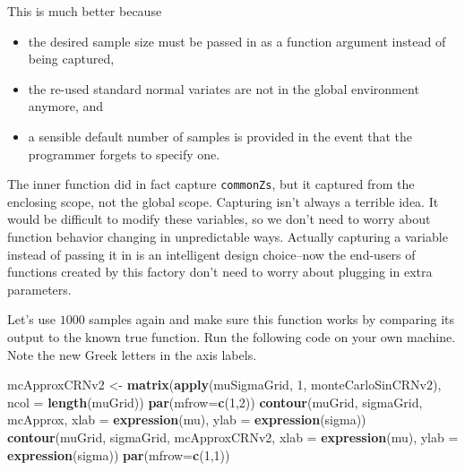\documentclass[12pt,krantz2]{krantz}
\makeatletter
\newenvironment{Shaded}{\begin{snugshade}}{\end{snugshade}}
\newcommand{\DataTypeTok}[1]{\textcolor[rgb]{0.27,0.27,0.27}{#1}}
\newcommand{\DecValTok}[1]{\textcolor[rgb]{0.06,0.06,0.06}{#1}}
\newcommand{\KeywordTok}[1]{\textcolor[rgb]{0.27,0.27,0.27}{\textbf{#1}}}
\newcommand{\NormalTok}[1]{#1}
\newcommand{\StringTok}[1]{\textcolor[rgb]{0.5,0.5,0.5}{#1}}
\providecommand{\tightlist}{%
  \setlength{\itemsep}{0pt}\setlength{\parskip}{0pt}}
\newenvironment{kframe}{%
\medskip{}
\setlength{\fboxsep}{.8em}
 \def\at@end@of@kframe{}%
 \ifinner\ifhmode%
  \def\at@end@of@kframe{\end{minipage}}%
  \begin{minipage}{\columnwidth}%
 \fi\fi%
 \def\FrameCommand##1{\hskip\@totalleftmargin \hskip-\fboxsep
 \colorbox{shadecolor}{##1}\hskip-\fboxsep
     \hskip-\linewidth \hskip-\@totalleftmargin \hskip\columnwidth}%
 \MakeFramed {\advance\hsize-\width
   \@totalleftmargin\z@ \linewidth\hsize
   \@setminipage}}%
 {\par\unskip\endMakeFramed%
 \at@end@of@kframe}
\renewenvironment{Shaded}{\begin{kframe}}{\end{kframe}}
\makeatother
\begin{document}
This is much better because

\begin{itemize}
\tightlist
\item
  the desired sample size must be passed in as a function argument instead of being captured,
\item
  the re-used standard normal variates are not in the global environment anymore, and
\item
  a sensible default number of samples is provided in the event that the programmer forgets to specify one.
\end{itemize}

The inner function did in fact capture \texttt{commonZs}, but it captured from the enclosing scope, not the global scope. Capturing isn't always a terrible idea. It would be difficult to modify these variables, so we don't need to worry about function behavior changing in unpredictable ways. Actually capturing a variable instead of passing it in is an intelligent design choice--now the end-users of functions created by this factory don't need to worry about plugging in extra parameters.

Let's use \(1000\) samples again and make sure this function works by comparing its output to the known true function. Run the following code on your own machine. Note the new Greek letters in the axis labels.

\begin{Shaded}
\begin{Highlighting}[]
\NormalTok{mcApproxCRNv2 <-}\StringTok{ }\KeywordTok{matrix}\NormalTok{(}\KeywordTok{apply}\NormalTok{(muSigmaGrid, }\DecValTok{1}\NormalTok{, monteCarloSinCRNv2), }
                        \DataTypeTok{ncol =} \KeywordTok{length}\NormalTok{(muGrid))}
\KeywordTok{par}\NormalTok{(}\DataTypeTok{mfrow=}\KeywordTok{c}\NormalTok{(}\DecValTok{1}\NormalTok{,}\DecValTok{2}\NormalTok{))}
\KeywordTok{contour}\NormalTok{(muGrid, sigmaGrid, mcApprox, }
        \DataTypeTok{xlab =} \KeywordTok{expression}\NormalTok{(mu), }\DataTypeTok{ylab =} \KeywordTok{expression}\NormalTok{(sigma))}
\KeywordTok{contour}\NormalTok{(muGrid, sigmaGrid, mcApproxCRNv2, }
        \DataTypeTok{xlab =} \KeywordTok{expression}\NormalTok{(mu), }\DataTypeTok{ylab =} \KeywordTok{expression}\NormalTok{(sigma))}
\KeywordTok{par}\NormalTok{(}\DataTypeTok{mfrow=}\KeywordTok{c}\NormalTok{(}\DecValTok{1}\NormalTok{,}\DecValTok{1}\NormalTok{))}
\end{Highlighting}
\end{Shaded}
\end{document}
